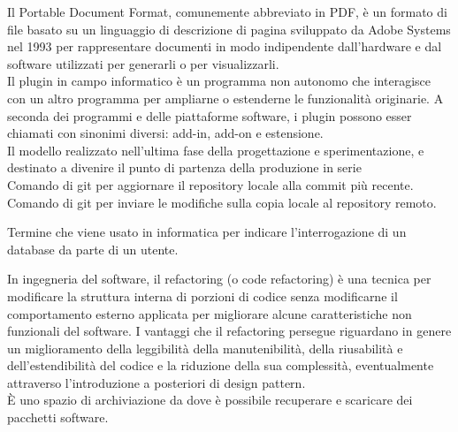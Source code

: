 \documentclass{scalatekids-article}
\begin{document}
   Il Portable Document Format, comunemente abbreviato in PDF, è un formato di file basato su un linguaggio di descrizione di pagina sviluppato da Adobe Systems nel 1993 per rappresentare documenti in modo indipendente dall'hardware e dal software utilizzati per generarli o per visualizzarli.
  \\

   Il plugin in campo informatico è un programma non autonomo che interagisce con un altro programma per ampliarne o estenderne le funzionalità originarie.
  A seconda dei programmi e delle piattaforme software, i plugin possono esser chiamati con sinonimi diversi: add-in, add-on e estensione.
  \\

   Il modello realizzato nell’ultima fase della progettazione e sperimentazione, e destinato a divenire il punto di partenza della produzione in serie
  \\

   Comando di git per aggiornare il repository locale alla commit più recente.
  \\

   Comando di git per inviare le modifiche sulla copia locale al repository remoto.
  \\


   Termine che viene usato in informatica per indicare l'interrogazione di un database da parte di un utente.
  \\


   In ingegneria del software, il refactoring (o code refactoring) è una tecnica per modificare la struttura interna di porzioni di codice senza modificarne il comportamento esterno applicata per migliorare alcune caratteristiche non funzionali del software.
  I vantaggi che il refactoring persegue riguardano in genere un miglioramento della leggibilità della manutenibilità, della riusabilità e dell'estendibilità del codice e la riduzione della sua complessità, eventualmente attraverso l'introduzione a posteriori di design pattern.
  \\

   È uno spazio di archiviazione da dove è possibile recuperare e scaricare dei pacchetti software.
  \\
\end{document}
